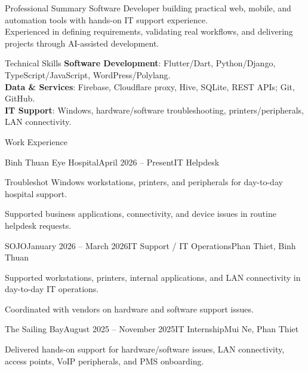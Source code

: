 \documentclass{resume}
\begin{document}
\begin{rSection}{Professional Summary}
Software Developer building practical web, mobile, and automation tools with hands-on IT support experience.\\
Experienced in defining requirements, validating real workflows, and delivering projects through AI-assisted development.
\end{rSection}

\begin{rSection}{Technical Skills}
\textbf{Software Development}: Flutter/Dart, Python/Django, TypeScript/JavaScript, WordPress/Polylang.\\
\textbf{Data \& Services}: Firebase, Cloudflare proxy, Hive, SQLite, REST APIs; Git, GitHub.\\
\textbf{IT Support}: Windows, hardware/software troubleshooting, printers/peripherals, LAN connectivity.
\end{rSection}

\begin{rSection}{Work Experience}

\begin{rSubsection}{Binh Thuan Eye Hospital}{April 2026 -- Present}{IT Helpdesk}{}
  \item Troubleshot Windows workstations, printers, and peripherals for day-to-day hospital support.
  \item Supported business applications, connectivity, and device issues in routine helpdesk requests.
\end{rSubsection}

\begin{rSubsection}{SOJO}{January 2026 -- March 2026}{IT Support / IT Operations}{Phan Thiet, Binh Thuan}
  \item Supported workstations, printers, internal applications, and LAN connectivity in day-to-day IT operations.
  \item Coordinated with vendors on hardware and software support issues.
\end{rSubsection}

\begin{rSubsection}{The Sailing Bay}{August 2025 -- November 2025}{IT Internship}{Mui Ne, Phan Thiet}
  \item Delivered hands-on support for hardware/software issues, LAN connectivity, access points, VoIP peripherals, and PMS onboarding.
\end{rSubsection}

\end{rSection}
\end{document}
